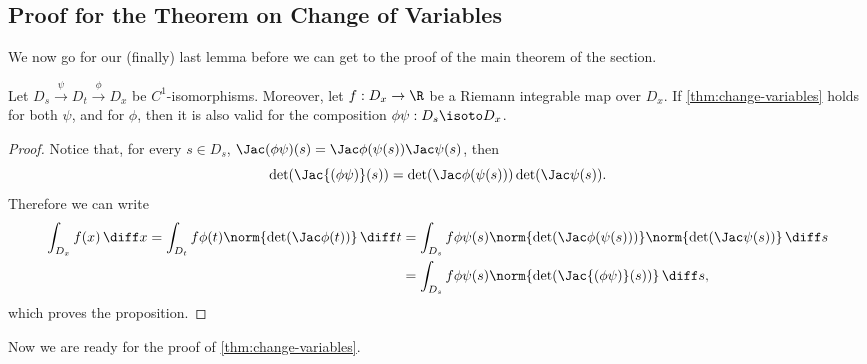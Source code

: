 \subsection{Proof for the Theorem on Change of Variables}
\label{subsub:change-variables-proof}

We now go for our (finally) last lemma before we can get to the proof of the
main theorem of the section.

\begin{lemma}
\label{lem:composition-diffeo-change-variables}
Let \(D_s \xrightarrow{\psi} D_t \xrightarrow{\phi} D_x\) be
\(C^1\)-isomorphisms. Moreover, let \(f: D_x \to \R\) be a Riemann integrable
map over \(D_x\). If \cref{thm:change-variables} holds for both \(\psi\), and
for \(\phi\), then it is also valid for the composition \(\phi \psi: D_s \isoto
D_x\).
\end{lemma}

\begin{proof}
Notice that, for every \(s \in D_s\), \(\Jac (\phi \psi)(s) = \Jac
\phi(\psi(s)) \Jac \psi(s)\), then
\[
  \det(\Jac {(\phi \psi)}(s)) = \det(\Jac \phi(\psi(s))) \det(\Jac \psi(s)).
\]
Therefore we can write
\begin{align*}
  \int_{D_x} f(x)\, \diff x
  = \int_{D_t} f \phi(t) \norm{\det(\Jac \phi(t))}\, \diff t
  &= \int_{D_s} f \phi \psi(s) \norm{\det(\Jac \phi(\psi(s)))}
  \norm{\det(\Jac \psi(s))}\, \diff s \\
  &= \int_{D_s} f \phi \psi(s) \norm{\det(\Jac{(\phi \psi)}(s))}\, \diff s,
\end{align*}
which proves the proposition.
\end{proof}

Now we are ready for the proof of \cref{thm:change-variables}.

